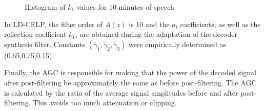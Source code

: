 \begin{figure}[hbtp]
  \begin{center}
    \makebox[10.41cm]{
      \rule{0cm}{6.3cm}
      \texttt{[image: k1]}
    }
  \end{center}
  \caption{Histogram of $k_1$ values for 10 minutes of speech
              \label{fig:distr-k1} }
\end{figure}

In LD-CELP, the filter order of $A(z)$ is 10 and the $a_i$
coefficients, as well as the reflection coefficient $k_1$, are
obtained during the adaptation of the decoder synthesis
filter. Constants $(\tilde{\gamma}_1,\tilde{\gamma}_2,\tilde{\gamma}_3)$ were empirically
determined as (0.65,0.75,0.15).

Finally, the AGC is responsible for making that the power of the
decoded signal after post-filtering be approximately the same as
before post-filtering. The AGC is calculated by the ratio of the
average signal amplitudes before and after post-filtering. This avoids
 too much attenuation or clipping.

